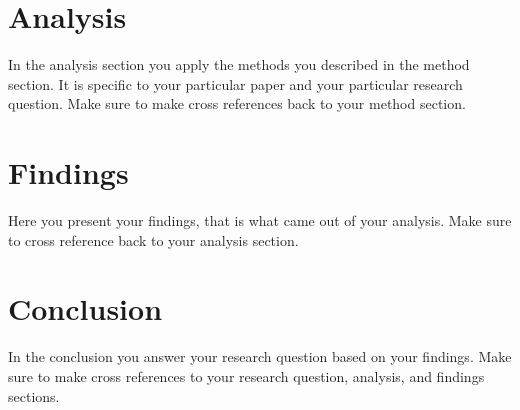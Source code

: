\documentclass[a4paper, twocolumn]{article}
\begin{document}
\section{Analysis\label{sec:Analysis}}

In the analysis section you apply the methods you described in the method section.
It is specific to your particular paper and your particular research question.
Make sure to make cross references back to your method section.

\section{Findings\label{sec:Findings}}

Here you present your findings, that is what came out of your analysis.
Make sure to cross reference back to your analysis section.

\section{Conclusion\label{sec:Conclusion}}

In the conclusion you answer your research question based on your findings.
Make sure to make cross references to your research question, analysis, and findings sections.

\printbibliography
\end{document}
